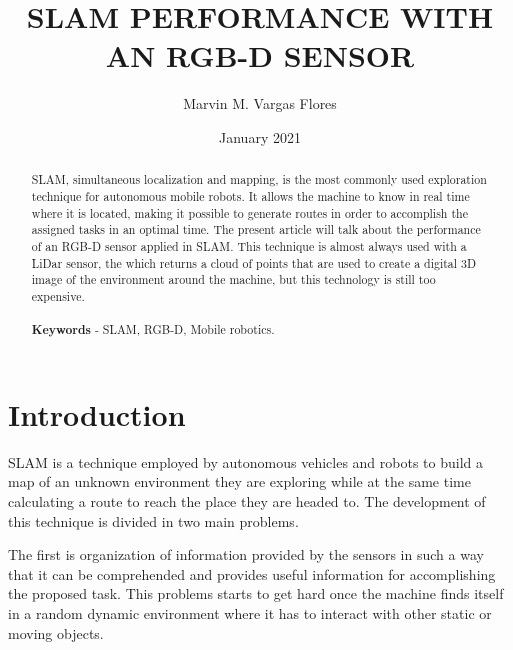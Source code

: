 \documentclass[12pt, letterpaper]{article}
\title{SLAM PERFORMANCE WITH AN RGB-D SENSOR}
\author{Marvin M. Vargas Flores}
\date{January 2021}
\begin{document}
	
	\maketitle
	
	
	
	
	
	\begin{abstract}
		SLAM, simultaneous localization and mapping, is the most commonly used exploration technique for autonomous mobile robots. It allows the machine to know in real time where it is located, making it possible to generate routes in order to accomplish the assigned tasks in an optimal time. The present article will talk about the performance of an RGB-D sensor  applied in SLAM. This technique is almost always used with a LiDar sensor, the which returns a cloud of points that are used to create a digital 3D image of the environment around the machine, but this technology is still too expensive. 
		\\
		\\
		 \textbf{Keywords} - SLAM, RGB-D, Mobile robotics.

		
	\end{abstract}
	
	\section{Introduction}
		SLAM is a technique employed by autonomous vehicles and robots to build a map of an unknown environment they are exploring while at the same time calculating a route to reach the place they are headed to.
		The development of this technique is divided in two main problems.
		
		 The first is organization of information provided by the sensors in such a way that it can be comprehended and provides useful information for accomplishing the proposed task. This problems starts to get hard once the machine finds itself in a random dynamic environment where it has to interact with other static or moving objects. 
		 
\end{document}

